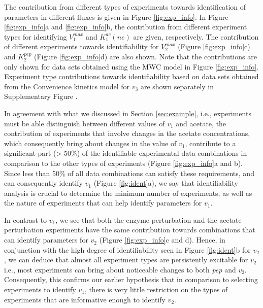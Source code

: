 \documentclass[10pt]{article}
\begin{document}
	The contribution from different types of experiments towards identification of parameters in different fluxes is given in Figure \ref{fig:exp_info}. In Figure \ref{fig:exp_info}a and \ref{fig:exp_info}b, the contribution from different experiment types for identifying $V_1^{max}$ and $K_1^{ac}(ne)$ are given, respectively. The contribution of different experiments towards identifiability for $V_2^{max}$ (Figure \ref{fig:exp_info}c) and $K_2^{pep}$ (Figure \ref{fig:exp_info}d) are also shown. Note that the contributions are only shown for data sets obtained using the MWC model in Figure \ref{fig:exp_info}. Experiment type contributions towards identifiability based on data sets obtained from the Convenience kinetics model for $v_3$ are shown separately in Supplementary Figure .
	
	In agreement with what we discussed in Section \ref{sec:example}, i.e., experiments must be able distinguish between different values of $v_1$ and acetate, the contribution of experiments that involve changes in the acetate concentrations, which consequently bring about changes in the value of $v_1$, contribute to a significant part (> 50\%) of the identifiable experimental data combinations in comparison to the other types of experiments (Figure \ref{fig:exp_info}a and b). Since less than 50\% of all data combinations can satisfy these requirements, and can consequently identify $v_1$ (Figure \ref{fig:ident}a), we say that identifiability analysis is crucial to determine the minimum number of experiments, as well as the nature of experiments that can help identify parameters for $v_1$. 
	
	In contrast to $v_1$, we see that both the enzyme perturbation and the acetate perturbation experiments have the same contribution towards combinations that can identify parameters for $v_2$ (Figure \ref{fig:exp_info}c and d). Hence, in conjunction with the high degree of identifiability seen in Figure \ref{fig:ident}b for $v_2$, we can deduce that almost all experiment types are persistently excitable for $v_2$ i.e., most experiments can bring about noticeable changes to both \textit{pep} and $v_2$. Consequently, this confirms our earlier hypothesis that in comparison to selecting experiments to identify $v_1$, there is very little restriction on the types of experiments that are informative enough to identify $v_2$.
	
\end{document}
